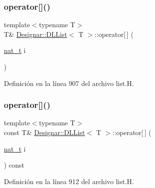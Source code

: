 \subsubsection{\texorpdfstring{operator[]()}{operator[]()}\hspace{0.1cm}{\footnotesize\ttfamily [1/2]}}
{\footnotesize\ttfamily template$<$typename T$>$ \\
T\& \hyperlink{class_designar_1_1_d_l_list}{Designar\+::\+D\+L\+List}$<$ T $>$\+::operator\mbox{[}$\,$\mbox{]} (\begin{DoxyParamCaption}\item[{\hyperlink{namespace_designar_aa72662848b9f4815e7bf31a7cf3e33d1}{nat\+\_\+t}}]{i }\end{DoxyParamCaption})\hspace{0.3cm}{\ttfamily [inline]}}



Definición en la línea 907 del archivo list.\+H.

\mbox{\label{class_designar_1_1_d_l_list_a24b5b31952821f0d40fef5326ba635b3}} 
\subsubsection{\texorpdfstring{operator[]()}{operator[]()}\hspace{0.1cm}{\footnotesize\ttfamily [2/2]}}
{\footnotesize\ttfamily template$<$typename T$>$ \\
const T\& \hyperlink{class_designar_1_1_d_l_list}{Designar\+::\+D\+L\+List}$<$ T $>$\+::operator\mbox{[}$\,$\mbox{]} (\begin{DoxyParamCaption}\item[{\hyperlink{namespace_designar_aa72662848b9f4815e7bf31a7cf3e33d1}{nat\+\_\+t}}]{i }\end{DoxyParamCaption}) const\hspace{0.3cm}{\ttfamily [inline]}}



Definición en la línea 912 del archivo list.\+H.

\mbox{\label{class_designar_1_1_d_l_list_a6fd7f99c303dc6897a72dabd5f1f943d}} 
